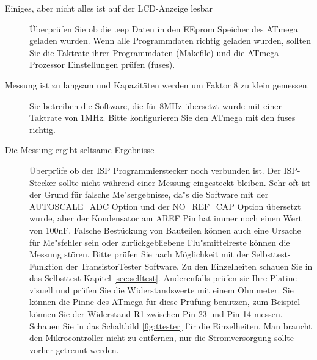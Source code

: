 \begin{description}
\item[Einiges, aber nicht alles ist auf der LCD-Anzeige lesbar] 
\"Uberpr\"ufen Sie ob die .eep Daten in den EEprom Speicher des ATmega geladen wurden.
Wenn alle Programmdaten richtig geladen wurden, sollten Sie die Taktrate ihrer
Programmdaten (Makefile) und die ATmega Prozessor Einstellungen pr\"ufen (fuses).

\item[Messung ist zu langsam und Kapazit\"aten werden um Faktor 8 zu klein gemessen.] 
Sie betreiben die Software, die f\"ur 8MHz \"ubersetzt wurde mit einer Taktrate von 1MHz.
Bitte konfigurieren Sie den ATmega mit den fuses richtig.

\item[Die Messung ergibt seltsame Ergebnisse]  
\"Uberpr\"ufe ob der ISP Programmierstecker noch verbunden ist.
Der ISP-Stecker sollte nicht w\"ahrend einer Messung eingesteckt bleiben.
Sehr oft ist der Grund f\"ur falsche Me"sergebnisse, da"s die Software mit der
 AUTOSCALE\_ADC Option und der NO\_REF\_CAP Option \"ubersetzt wurde, aber der
Kondensator am AREF Pin hat immer noch einen Wert von 100nF.
Falsche Best\"uckung von Bauteilen k\"onnen auch eine Ursache f\"ur Me"sfehler sein 
oder zur\"uckgebliebene Flu"smittelreste k\"onnen die Messung st\"oren.
Bitte pr\"ufen Sie nach M\"oglichkeit mit der Selbsttest-Funktion der
TransistorTester Software.
Zu den Einzelheiten schauen Sie in das Selbsttest Kapitel \ref{sec:selftest}.
Anderenfalls pr\"ufen sie Ihre Platine visuell und pr\"ufen Sie die Widerstandswerte
mit einem Ohmmeter. Sie k\"onnen die Pinne des ATmega f\"ur diese Pr\"ufung benutzen,
zum Beispiel k\"onnen Sie der Widerstand R1 zwischen Pin 23 und Pin 14 messen.
Schauen Sie in das Schaltbild \ref{fig:ttester} f\"ur die Einzelheiten.
Man braucht den Mikrocontroller nicht zu entfernen, nur die Stromversorgung sollte
vorher getrennt werden.

\end{description}
